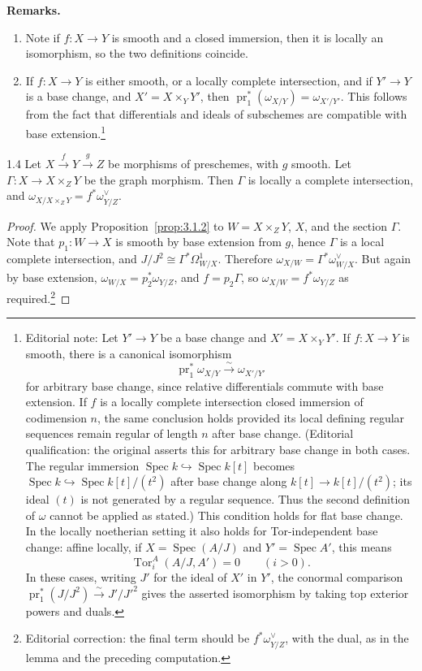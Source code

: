 \textbf{Remarks.}
\begin{enumerate}
\item Note if $f\colon X\to Y$ is smooth and a closed immersion, then it is locally an isomorphism, so the two definitions coincide.
\item If $f\colon X\to Y$ is either smooth, or a locally complete intersection, and if $Y'\to Y$ is a base change, and $X'=X\times_Y Y'$, then $\operatorname{pr}_1^*(\omega_{X/Y})=\omega_{X'/Y'}$. This follows from the fact that differentials and ideals of subschemes are compatible with base extension.\footnote{Editorial note: Let $Y'\to Y$ be a base change and $X'=X\times_Y Y'$. If $f\colon X\to Y$ is smooth, there is a canonical isomorphism
\[
\operatorname{pr}_1^*\omega_{X/Y}\xrightarrow{\sim}\omega_{X'/Y'}
\]
for arbitrary base change, since relative differentials commute with base extension. If $f$ is a locally complete intersection closed immersion of codimension $n$, the same conclusion holds provided its local defining regular sequences remain regular of length $n$ after base change. (Editorial qualification: the original asserts this for arbitrary base change in both cases. The regular immersion $\operatorname{Spec}k\hookrightarrow\operatorname{Spec}k[t]$ becomes $\operatorname{Spec}k\hookrightarrow\operatorname{Spec}k[t]/(t^2)$ after base change along $k[t]\to k[t]/(t^2)$; its ideal $(t)$ is not generated by a regular sequence. Thus the second definition of $\omega$ cannot be applied as stated.) This condition holds for flat base change. In the locally noetherian setting it also holds for Tor-independent base change: affine locally, if $X=\operatorname{Spec}(A/J)$ and $Y'=\operatorname{Spec}A'$, this means
\[
\operatorname{Tor}_i^A(A/J,A')=0\qquad(i>0).
\]
In these cases, writing $J'$ for the ideal of $X'$ in $Y'$, the conormal comparison
$\operatorname{pr}_1^*(J/J^2)\xrightarrow{\sim}J'/J'^2$
gives the asserted isomorphism by taking top exterior powers and duals.}
\end{enumerate}

\begin{booklemma}{1.4}\label{lem:3.1.4}
Let $X\xrightarrow{f} Y\xrightarrow{g} Z$ be morphisms of preschemes, with $g$ smooth. Let $\Gamma\colon X\to X\times_Z Y$ be the graph morphism. Then $\Gamma$ is locally a complete intersection, and $\omega_{X/X\times_Z Y}=f^*\omega_{Y/Z}^{\vee}$.
\end{booklemma}

\begin{proof}
We apply Proposition~\ref{prop:3.1.2} to $W=X\times_Z Y$, $X$, and the section $\Gamma$. Note that $p_1\colon W\to X$ is smooth by base extension from $g$, hence $\Gamma$ is a local complete intersection, and $J/J^2\cong\Gamma^*\Omega^1_{W/X}$. Therefore $\omega_{X/W}=\Gamma^*\omega_{W/X}^{\vee}$. But again by base extension, $\omega_{W/X}=p_2^*\omega_{Y/Z}$, and $f=p_2\Gamma$, so $\omega_{X/W}=f^*\omega_{Y/Z}$ as required.\footnote{Editorial correction: the final term should be $f^*\omega_{Y/Z}^{\vee}$, with the dual, as in the lemma and the preceding computation.}
\end{proof}

